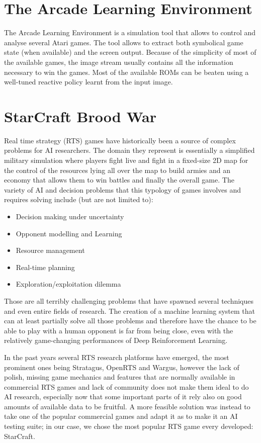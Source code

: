 \documentclass[bsc,frontabs,twoside,parskip,deptreport]{infthesis}     %
\begin{document}
\section{The Arcade Learning Environment}
The Arcade Learning Environment is a simulation tool that allows to control and
analyse several Atari games. The tool allows to extract both symbolical game
state (when available) and the screen output. Because of the simplicity of most
of the available games, the image stream usually contains all the information
necessary to win the games. Most of the available ROMs can be beaten using a
well-tuned reactive policy learnt from the input image\cite{mnih2015human}.

\section{StarCraft Brood War}
Real time strategy (RTS) games have historically been a source of complex
problems for AI researchers. The domain they represent is essentially a
simplified military simulation where players fight live and fight in a
fixed-size 2D map for the control of the resources lying all over the map to
build armies and an economy that allows them to win battles and finally the
overall game. The variety of AI and decision problems that this typology of
games involves and requires solving include (but are not limited to):

\begin{itemize}
  \item Decision making under uncertainty
  \item Opponent modelling and Learning
  \item Resource management
  \item Real-time planning
  \item Exploration/exploitation dilemma
\end{itemize}

Those are all terribly challenging problems that have spawned several techniques
and even entire fields of research\cite{buro2003real}. The creation of a machine
learning system that can at least partially solve all those problems and
therefore have the chance to be able to play with a human opponent is far from
being close, even with the relatively game-changing performances of Deep
Reinforcement Learning.

In the past years several RTS research platforms have emerged, the most
prominent ones being Stratagus, OpenRTS and Wargus, however the lack of polish,
missing game mechanics and features that are normally available in commercial
RTS games and lack of community does not make them ideal to do AI research,
especially now that some important parts of it rely also on good amounts of
available data to be fruitful. A more feasible solution was instead to take one
of the popular commercial games and adapt it as to make it an AI testing suite;
in our case, we chose the most popular RTS game every developed: StarCraft.
\end{document}
